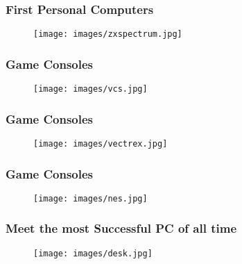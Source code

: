 \documentclass{beamer}
\begin{document}

\begin{frame}
\frametitle{First Personal Computers}

\begin{figure}
\texttt{[image: images/zxspectrum.jpg]}
\end{figure}

\end{frame}


\begin{frame}
\frametitle{Game Consoles}

\begin{figure}
\texttt{[image: images/vcs.jpg]}
\end{figure}

\end{frame}


\begin{frame}
\frametitle{Game Consoles}

\begin{figure}
\texttt{[image: images/vectrex.jpg]}
\end{figure}

\end{frame}


\begin{frame}
\frametitle{Game Consoles}

\begin{figure}
\texttt{[image: images/nes.jpg]}
\end{figure}

\end{frame}


\begin{frame}
\frametitle{Meet the most Successful PC of all time}

\begin{figure}
\texttt{[image: images/desk.jpg]}
\end{figure}

\end{frame}

\end{document}
